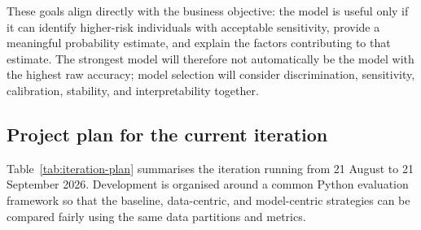 These goals align directly with the business objective: the model is useful only if it can identify higher-risk individuals with acceptable sensitivity, provide a meaningful probability estimate, and explain the factors contributing to that estimate. The strongest model will therefore not automatically be the model with the highest raw accuracy; model selection will consider discrimination, sensitivity, calibration, stability, and interpretability together.

\subsection{Project plan for the current iteration}
\label{subsec:project-plan}

Table~\ref{tab:iteration-plan} summarises the iteration running from 21 August to 21 September 2026. Development is organised around a common Python evaluation framework so that the baseline, data-centric, and model-centric strategies can be compared fairly using the same data partitions and metrics.


